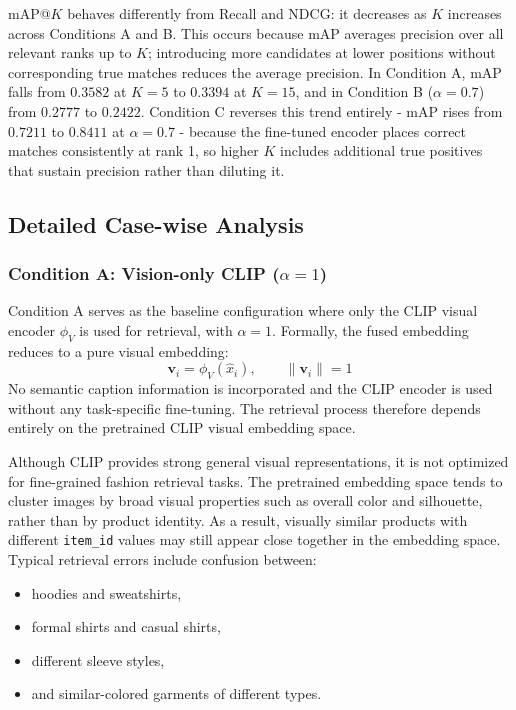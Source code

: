 \documentclass[12pt,a4paper]{article}
\begin{document}
mAP@$K$ behaves differently from Recall and NDCG: it decreases as $K$
increases across Conditions A and B. This occurs because mAP averages precision
over all relevant ranks up to $K$; introducing more candidates at lower
positions without corresponding true matches reduces the average precision.
In Condition A, mAP falls from $0.3582$ at $K{=}5$ to $0.3394$ at $K{=}15$,
and in Condition B ($\alpha{=}0.7$) from $0.2777$ to $0.2422$. Condition C
reverses this trend entirely - mAP rises from $0.7211$ to $0.8411$ at
$\alpha{=}0.7$ - because the fine-tuned encoder places correct matches
consistently at rank 1, so higher $K$ includes additional true positives that
sustain precision rather than diluting it.

\subsection{Detailed Case-wise Analysis}

\subsubsection{Condition A: Vision-only CLIP ($\alpha = 1$)}

Condition A serves as the baseline configuration where only the CLIP visual
encoder $\phi_V$ is used for retrieval, with $\alpha = 1$. Formally, the
fused embedding reduces to a pure visual embedding:
\begin{equation}
    \mathbf{v}_i = \phi_V(\hat{x}_i), \qquad \|\mathbf{v}_i\| = 1
\end{equation}
No semantic caption information is incorporated and the CLIP encoder is used
without any task-specific fine-tuning. The retrieval process therefore depends
entirely on the pretrained CLIP visual embedding space.

Although CLIP provides strong general visual representations, it is not
optimized for fine-grained fashion retrieval tasks. The pretrained embedding
space tends to cluster images by broad visual properties such as overall color
and silhouette, rather than by product identity. As a result, visually similar
products with different \texttt{item\_id} values may still appear close
together in the embedding space. Typical retrieval errors include confusion
between:
\begin{itemize}[noitemsep]
    \item hoodies and sweatshirts,
    \item formal shirts and casual shirts,
    \item different sleeve styles,
    \item and similar-colored garments of different types.
\end{itemize}
\end{document}
